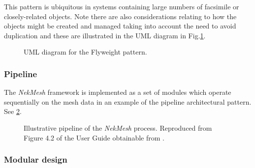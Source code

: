 This pattern is ubiquitous in systems containing large numbers of facsimile or closely-related objects.  
Note there are also considerations relating to how the objects might be created and managed taking into account the need to avoid duplication and these are illustrated in the UML diagram in Fig.\ref{fig:flyweightuml}.

\begin{figure}
\centerline{}
\caption{\label{fig:flyweightuml}
UML diagram for the Flyweight pattern.}
\end{figure}

\subsubsection{Pipeline}

The {\it NekMesh} framework is implemented as a set of modules which operate sequentially on the mesh data in an example of the pipeline architectural pattern.  See \ref{fig:pipeline}.

\begin{figure}
\centerline{}
\caption{\label{fig:pipeline}
Illustrative pipeline of the {\it NekMesh} process.  Reproduced from Figure 4.2 of the User Guide obtainable from \cite{nektarwebsite}.}
\end{figure}

\subsubsection{Modular design}\label{sec:modular}

